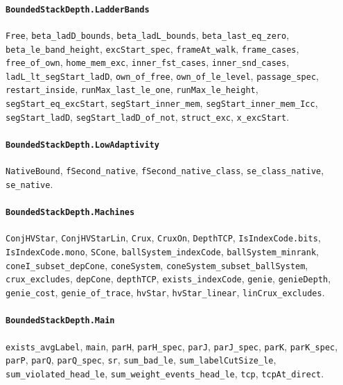 \paragraph{\texttt{BoundedStackDepth.LadderBands}}
{\small\raggedright \texttt{Free}, \texttt{beta\_ladD\_bounds}, \texttt{beta\_ladL\_bounds}, \texttt{beta\_last\_eq\_zero}, \texttt{beta\_le\_band\_height}, \texttt{excStart\_spec}, \texttt{frameAt\_walk}, \texttt{frame\_cases}, \texttt{free\_of\_own}, \texttt{home\_mem\_exc}, \texttt{inner\_fst\_cases}, \texttt{inner\_snd\_cases}, \texttt{ladL\_lt\_segStart\_ladD}, \texttt{own\_of\_free}, \texttt{own\_of\_le\_level}, \texttt{passage\_spec}, \texttt{restart\_inside}, \texttt{runMax\_last\_le\_one}, \texttt{runMax\_le\_height}, \texttt{segStart\_eq\_excStart}, \texttt{segStart\_inner\_mem}, \texttt{segStart\_inner\_mem\_Icc}, \texttt{segStart\_ladD}, \texttt{segStart\_ladD\_of\_not}, \texttt{struct\_exc}, \texttt{x\_excStart}.\par}

\paragraph{\texttt{BoundedStackDepth.LowAdaptivity}}
{\small\raggedright \texttt{NativeBound}, \texttt{fSecond\_native}, \texttt{fSecond\_native\_class}, \texttt{se\_class\_native}, \texttt{se\_native}.\par}

\paragraph{\texttt{BoundedStackDepth.Machines}}
{\small\raggedright \texttt{ConjHVStar}, \texttt{ConjHVStarLin}, \texttt{Crux}, \texttt{CruxOn}, \texttt{DepthTCP}, \texttt{IsIndexCode.bits}, \texttt{IsIndexCode.mono}, \texttt{SCone}, \texttt{ballSystem\_indexCode}, \texttt{ballSystem\_minrank}, \texttt{coneI\_subset\_depCone}, \texttt{coneSystem}, \texttt{coneSystem\_subset\_ballSystem}, \texttt{crux\_excludes}, \texttt{depCone}, \texttt{depthTCP}, \texttt{exists\_indexCode}, \texttt{genie}, \texttt{genieDepth}, \texttt{genie\_cost}, \texttt{genie\_of\_trace}, \texttt{hvStar}, \texttt{hvStar\_linear}, \texttt{linCrux\_excludes}.\par}

\paragraph{\texttt{BoundedStackDepth.Main}}
{\small\raggedright \texttt{exists\_avgLabel}, \texttt{main}, \texttt{parH}, \texttt{parH\_spec}, \texttt{parJ}, \texttt{parJ\_spec}, \texttt{parK}, \texttt{parK\_spec}, \texttt{parP}, \texttt{parQ}, \texttt{parQ\_spec}, \texttt{sr}, \texttt{sum\_bad\_le}, \texttt{sum\_labelCutSize\_le}, \texttt{sum\_violated\_head\_le}, \texttt{sum\_weight\_events\_head\_le}, \texttt{tcp}, \texttt{tcpAt\_direct}.\par}

